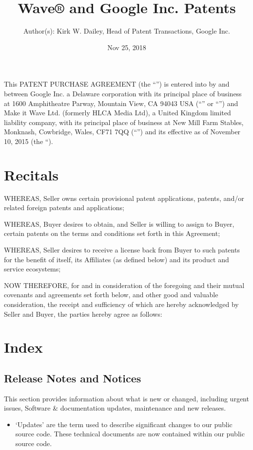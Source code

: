 \documentclass[letterpaper,10pt,english]{sphinxmanual}
\title{Wave® and Google Inc. Patents}
\date{Nov 25, 2018}
\author{Author(s): Kirk W. Dailey, Head of Patent Transactions, Google Inc.}
\begin{document}
\pagestyle{empty}
\maketitle
\pagestyle{plain}
\sphinxtableofcontents
\pagestyle{normal}
\label{\detokenize{index::doc}}


This PATENT PURCHASE AGREEMENT (the “”) is entered into by and between Google Inc. a Delaware corporation with its principal place of business at 1600 Amphitheatre Parway, Mountain View, CA 94043 USA (“” or “”) and Make it Wave Ltd. (formerly HLCA Media Ltd), a United Kingdom limited liability company, with its principal place of business at New Mill Farm Stables, Monknash, Cowbridge, Wales, CF71 7QQ (“”) and its effective as of November 10, 2015 (the “).


\chapter{Recitals}
\label{\detokenize{index:recitals}}
WHEREAS, Seller owns certain provisional patent applications, patents, and/or related foreign patents and applications;

WHEREAS, Buyer desires to obtain, and Seller is willing to assign to Buyer, certain patents on the terms and conditions set forth in this Agreement;

WHEREAS, Seller desires to receive a license back from Buyer to such patents for the benefit of itself, its Affiliates (as defined below) and its product and service ecosystems;

NOW THEREFORE, for and in consideration of the foregoing and their mutual covenants and agreements set forth below, and other good and valuable consideration, the receipt and sufficiency of which are hereby acknowledged by Seller and Buyer, the parties hereby agree as follows:


\chapter{Index}
\label{\detokenize{index:index}}

\section{Release Notes and Notices}
\label{\detokenize{releasenotes:release-notes-and-notices}}\label{\detokenize{releasenotes::doc}}
This section provides information about what is new or changed, including urgent issues, Software \& documentation updates, maintenance and new releases.
\begin{itemize}
\item {} 
‘Updates’ are the term used to describe significant changes to our public source code. These technical documents are now contained within our public source code.

\end{itemize}
\end{document}
